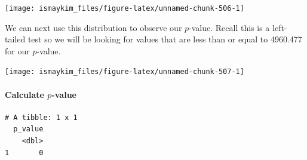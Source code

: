 \documentclass[12pt,]{krantz}
\makeatletter
\newenvironment{Shaded}{\begin{snugshade}}{\end{snugshade}}
\newcommand{\KeywordTok}[1]{\textcolor[rgb]{0.27,0.27,0.27}{\textbf{#1}}}
\newcommand{\DataTypeTok}[1]{\textcolor[rgb]{0.27,0.27,0.27}{#1}}
\newcommand{\StringTok}[1]{\textcolor[rgb]{0.5,0.5,0.5}{#1}}
\newcommand{\OperatorTok}[1]{\textcolor[rgb]{0.43,0.43,0.43}{\textbf{#1}}}
\newcommand{\NormalTok}[1]{#1}
\let\oldparagraph\paragraph
\renewcommand{\paragraph}[1]{\oldparagraph{#1}\mbox{}}
\newenvironment{kframe}{%
\medskip{}
\setlength{\fboxsep}{.8em}
 \def\at@end@of@kframe{}%
 \ifinner\ifhmode%
  \def\at@end@of@kframe{\end{minipage}}%
  \begin{minipage}{\columnwidth}%
 \fi\fi%
 \def\FrameCommand##1{\hskip\@totalleftmargin \hskip-\fboxsep
 \colorbox{shadecolor}{##1}\hskip-\fboxsep
     \hskip-\linewidth \hskip-\@totalleftmargin \hskip\columnwidth}%
 \MakeFramed {\advance\hsize-\width
   \@totalleftmargin\z@ \linewidth\hsize
   \@setminipage}}%
 {\par\unskip\endMakeFramed%
 \at@end@of@kframe}
\renewenvironment{Shaded}{\begin{kframe}}{\end{kframe}}
\makeatother
\begin{document}
\begin{Shaded}
\end{Shaded}

\begin{center}\texttt{[image: ismaykim\_files/figure-latex/unnamed-chunk-506-1]} \end{center}

We can next use this distribution to observe our \(p\)-value. Recall
this is a left-tailed test so we will be looking for values that are
less than or equal to 4960.477 for our \(p\)-value.

\begin{Shaded}
\end{Shaded}

\begin{center}\texttt{[image: ismaykim\_files/figure-latex/unnamed-chunk-507-1]} \end{center}

\paragraph{\texorpdfstring{Calculate
\(p\)-value}{Calculate p-value}}\label{calculate-p-value-4}

\begin{Shaded}
\end{Shaded}

\begin{verbatim}
# A tibble: 1 x 1
  p_value
    <dbl>
1       0
\end{verbatim}
\end{document}
